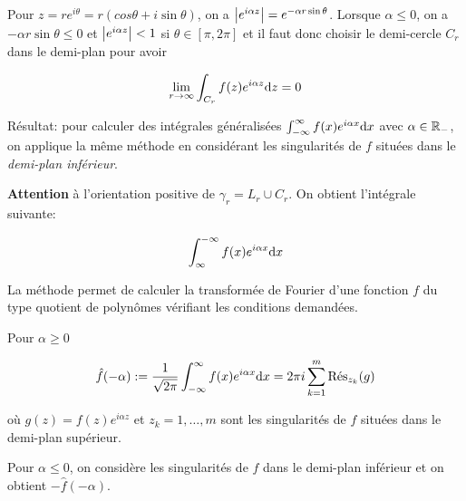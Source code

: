 \begin{remark}[1]
    Pour $z = r e^{i\theta} = r(cos \theta + i \sin \theta)$, on a $\module{e^{i\alpha z}} = e^{-\alpha r \sin \theta}$.
    Lorsque $\alpha \leq 0$, on a $-\alpha r \sin \theta \leq 0$ et $\module{e^{i\alpha z}} < 1$ si $\theta \in [\pi, 2\pi]$ et il faut donc choisir le demi-cercle $C_r$ dans le demi-plan pour avoir
    
    \[ \lim_{r \rightarrow \infty} \int_{C_r} f(z) e^{i\alpha z} \dz = 0 \]
    
    Résultat: pour calculer des intégrales généralisées $\int_{-\infty}^\infty f(x) e^{i\alpha x} \dx$ avec $\alpha \in \R_-$, on applique la même méthode en considérant les singularités de $f$ situées dans le \textit{demi-plan inférieur}.
    
    \textbf{Attention} à l'orientation positive de $\gamma_r = L_r \cup C_r$.
    On obtient l'intégrale suivante:
    
    \[ \int_{\infty}^{-\infty} f(x) e^{i\alpha x} \dx \]
\end{remark}

\begin{remark}[2]
    La méthode permet de calculer la transformée de Fourier d'une fonction $f$ du type quotient de polynômes vérifiant les conditions demandées.
    
    Pour $\alpha \geq 0$
    
    \[ \hat{f}(-\alpha) := \ostpi \int_{-\infty}^\infty f(x)e^{i\alpha x} \dx = 2\pi i \sum_{k = 1}^m \Res_{z_k}(g) \]
    
    où $g(z) = f(z) e^{i\alpha z}$ et $z_k = 1, \ldots, m$ sont les singularités de $f$ situées dans le demi-plan supérieur.
    
    Pour $\alpha \leq 0$, on considère les singularités de $f$ dans le demi-plan inférieur et on obtient $-\hat{f}(-\alpha)$.
\end{remark}
